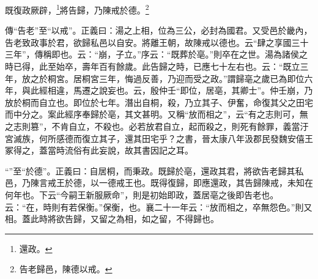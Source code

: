 既復政厥辟，\footnote{還政。}將告歸，乃陳戒於德。\footnote{告老歸邑，陳德以戒。}


{\noindent\zhuan{}\fzbyks 傳“告老”至“以戒”。正義曰：湯之上相，位為三公，必封為國君。又受邑於畿內，告老致政事於君，欲歸私邑以自安。將離王朝，故陳戒以德也。云“肆之享國三十三年”，傳稱即也。云：“崩，子立。”序云：“既葬於亳。”則卒在之世。湯為諸侯之時已得，此至始卒，壽年百有餘歲。此告歸之時，已應七十左右也。云：“既立三年，放之於桐宮。居桐宮三年，悔過反善，乃迎而受之政。”謂歸亳之歲已為即位六年，與此經相違，馬遷之說妄也。云，殷仲壬“即位，居亳，其卿士”。仲壬崩，乃放於桐而自立也。即位於七年。潛出自桐，殺，乃立其子、伊奮，命復其父之田宅而中分之。案此經序奉歸於亳，其文甚明。又稱“放而相之”，云“有之志則可，無之志則篡”，不肯自立，不殺也。必若放君自立，起而殺之，則死有餘罪，義當汙宮滅族，何所感德而復立其子，還其田宅乎？之書，晉太康八年汲郡民發魏安僖王冢得之，蓋當時流俗有此妄說，故其書因記之耳。 \par}

{\noindent\shu{}\fzkt “”至“於德”。正義曰：自居桐，而秉政。既歸於亳，還政其君，將欲告老歸其私邑，乃陳言戒王於德，以一德戒王也。既得復歸，即應還政，其告歸陳戒，未知在何年也。下云“今嗣王新服厥命”，則是初始即政，蓋居亳之後即告老也。云：“在，時則有若保衡。”保衡，也。襄二十一年云：“放而相之，卒無怨色。”則又相。蓋此時將欲告歸，又留之為相，如之留，不得歸也。 \par}

